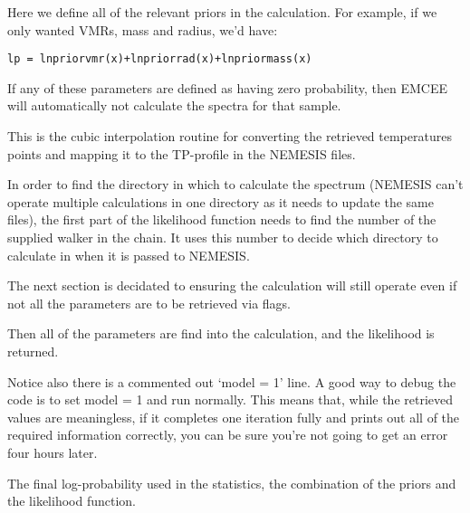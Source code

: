 \documentclass[11pt, a4paper,titlepage]{report}
\begin{document}


Here we define all of the relevant priors in the calculation. For example, if we only wanted VMRs, mass and radius, we'd have:


\lstset{language=python} 
\begin{lstlisting}
lp = lnpriorvmr(x)+lnpriorrad(x)+lnpriormass(x)
\end{lstlisting}

If any of these parameters are defined as having zero probability, then EMCEE will automatically not calculate the spectra for that sample. 



This is the cubic interpolation routine for converting the retrieved temperatures points and mapping it to the TP-profile in the NEMESIS files.



In order to find the directory in which to calculate the spectrum (NEMESIS can't operate multiple calculations in one directory as it needs to update the same files), the first part of the likelihood function needs to find the number of the supplied walker in the chain. It uses this number to decide which directory to calculate in when it is passed to NEMESIS. 

The next section is decidated to ensuring the calculation will still operate even if not all the parameters are to be retrieved via flags. 

Then all of the parameters are find into the calculation, and the likelihood is returned.

Notice also there is a commented out `model = 1' line. A good way to debug the code is to set model = 1 and run normally. This means that, while the retrieved values are meaningless, if it completes one iteration fully and prints out all of the required information correctly, you can be sure you're not going to get an error four hours later.



The final log-probability used in the statistics, the combination of the priors and the likelihood function. 


\end{document}
